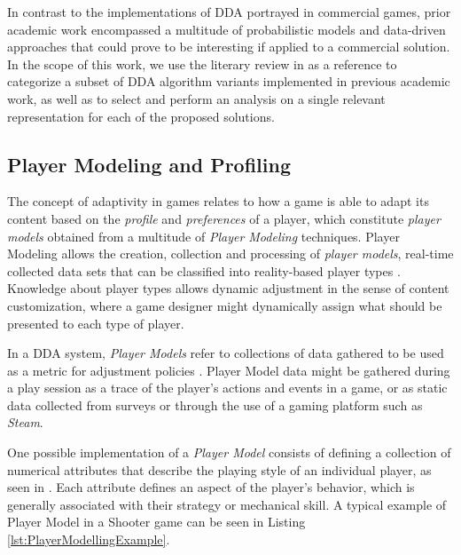 In contrast to the implementations of DDA portrayed in commercial games, prior academic work encompassed a multitude of probabilistic models and data-driven approaches that could prove to be interesting if applied to a commercial solution. In the scope of this work, we use the literary review in \cite{article_ddareview} as a reference to categorize a subset of DDA algorithm variants implemented in previous academic work, as well as to select and perform an analysis on a single relevant representation for each of the proposed solutions.


\subsection{Player Modeling and Profiling}

The concept of adaptivity in games relates to how a game is able to adapt its content based on the \emph{profile} and \emph{preferences} of a player, which constitute \emph{player models} obtained from a multitude of \emph{Player Modeling} techniques. Player Modeling allows the creation, collection and processing of \emph{player models}, real-time collected data sets that can be classified into reality-based player types \cite{ARTICLE_DynamicPlayerModelling}. Knowledge about player types allows dynamic adjustment in the sense of content customization, where a game designer might dynamically assign what should be presented to each type of player.

In a DDA system, \emph{Player Models} refer to collections of data gathered to be used as a metric for adjustment policies \cite{PHD_DynamicDifficultyAdjustment}. Player Model data might be gathered during a play session as a trace of the player's actions and events in a game, or as static data collected from surveys or through the use of a gaming platform such as \emph{Steam}.

One possible implementation of a \emph{Player Model} consists of defining a collection of numerical attributes that describe the playing style of an individual player, as seen in \cite{BOOK_PlayerModeling}. Each attribute defines an aspect of the player's behavior, which is generally associated with their strategy or mechanical skill. A typical example of Player Model in a Shooter game can be seen in Listing \ref{lst:PlayerModellingExample}.

